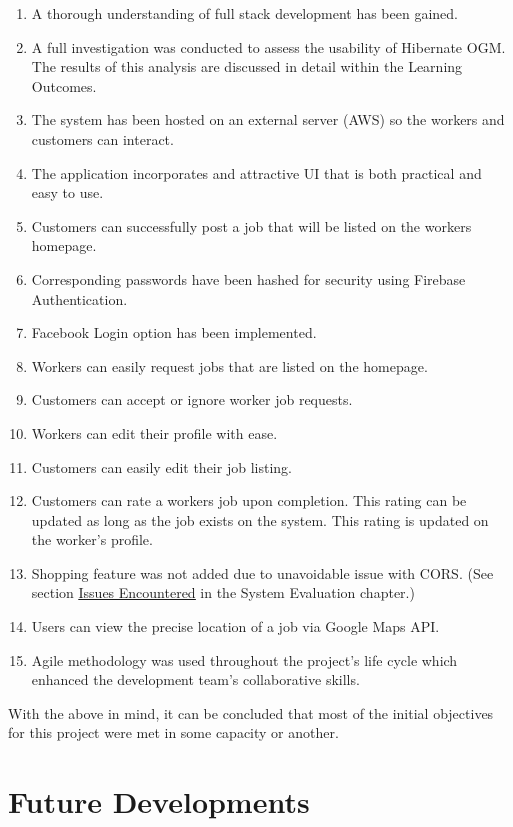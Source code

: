 \begin{enumerate}
    \item A thorough understanding of full stack development has been gained.
    \item A full investigation was conducted to assess the usability of Hibernate OGM. The results of this analysis are discussed in detail within the Learning Outcomes.
    \item The system has been hosted on an external server (AWS) so the workers and customers can interact.
    \item The application incorporates and attractive UI that is both practical and easy to use.
    \item Customers can successfully post a job that will be listed on the workers homepage.
    \item Corresponding passwords have been hashed for security using Firebase Authentication.
    \item Facebook Login option has been implemented.
    \item Workers can easily request jobs that are listed on the homepage.
    \item Customers can accept or ignore worker job requests.
    \item Workers can edit their profile with ease.
    \item Customers can easily edit their job listing.
    \item Customers can rate a workers job upon completion. This rating can be updated as long as the job exists on the system. This rating is updated on the worker's profile.
    \item Shopping feature was not added due to unavoidable issue with CORS. (See section \hyperref[sec:SystemEvaluationWebScraping]{\underline{Issues Encountered}} in the System Evaluation chapter.)
    \item Users can view the precise location of a job via Google Maps API.
    \item Agile methodology was used throughout the project's life cycle which enhanced the development team's collaborative skills.
\end{enumerate}

With the above in mind, it can be concluded that most of the initial objectives for this project were met in some capacity or another.

\section{Future Developments}
\label{sec:ConclusionFutureDevelopments}

